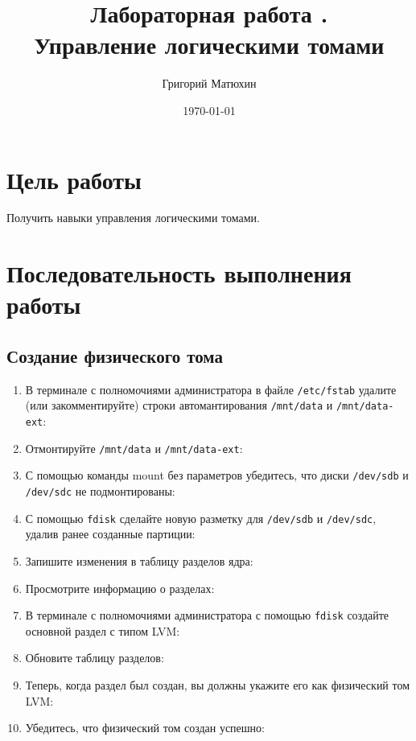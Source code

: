 \documentclass[12pt]{article}
\author{Григорий Матюхин}
\date{\today}
\title{Лабораторная работа \textnumero15.\\Управление логическими томами}
\begin{document}
\maketitle
\newpage
\tableofcontents
\newpage
\section{Цель работы}
Получить навыки управления логическими томами.

\section{Последовательность выполнения работы}
\subsection{Создание физического тома}
\begin{enumerate}
	\item В терминале с полномочиями администратора в файле \texttt{/etc/fstab} удалите (или
	      закомментируйте) строки автомантирования \texttt{/mnt/data} и \texttt{/mnt/data-ext}:
	\item Отмонтируйте \texttt{/mnt/data} и \texttt{/mnt/data-ext}:
	\item С помощью команды mount без параметров убедитесь, что диски \texttt{/dev/sdb}
	      и \texttt{/dev/sdc} не подмонтированы:
	\item С помощью \texttt{fdisk} сделайте новую разметку для \texttt{/dev/sdb} и \texttt{/dev/sdc}, удалив
	      ранее созданные партиции:
	\item Запишите изменения в таблицу разделов ядра:
	\item Просмотрите информацию о разделах:
	\item В терминале с полномочиями администратора с помощью \texttt{fdisk} создайте основной раздел с типом LVM:
	\item Обновите таблицу разделов:
	\item Теперь, когда раздел был создан, вы должны укажите его как физический том LVM:
	\item Убедитесь, что физический том создан успешно:
\end{enumerate}
\end{document}
